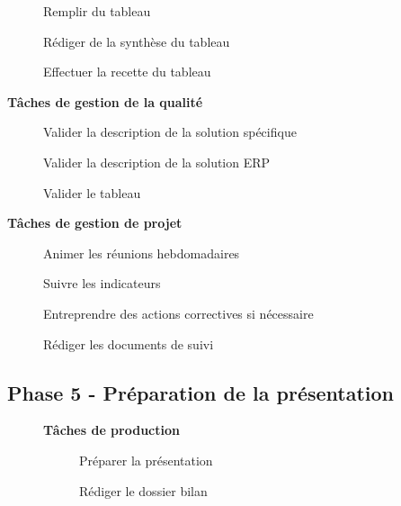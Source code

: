 \begin{description}
\begin{description}
\begin{description}
\begin{description}
                            \item[\textbullet] Remplir du tableau
                            \item[\textbullet] Rédiger de la synthèse du tableau
                            \item[\textbullet] Effectuer la recette du tableau
                        \end{description}
                \end{description}
        \end{description}
    \item[] \bf{Tâches de gestion de la qualité}
        \begin{description}
            \item[\textbullet] Valider la description de la solution spécifique
            \item[\textbullet] Valider la description de la solution ERP
            \item[\textbullet] Valider le tableau
        \end{description}
    \item[] \bf{Tâches de gestion de projet}
        \begin{description}
            \item[\textbullet] Animer les réunions hebdomadaires
            \item[\textbullet] Suivre les indicateurs
            \item[\textbullet] Entreprendre des actions correctives si nécessaire 
            \item[\textbullet] Rédiger les documents de suivi
        \end{description}
\end{description}

\subsection{Phase 5 - Préparation de la présentation}

\begin{description}
    \item[] \bf{Tâches de production}
        \begin{description}
            \item[\textbullet] Préparer la présentation
            \item[\textbullet] Rédiger le dossier bilan
        \end{description}
\end{description}